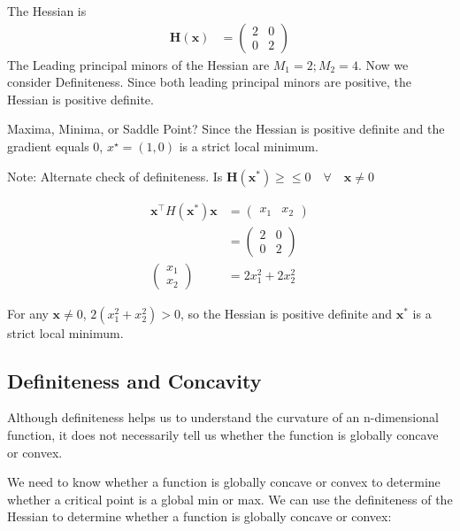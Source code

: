 \documentclass[]{book}
\theoremstyle{definition}
\theoremstyle{definition}
\theoremstyle{definition}
\theoremstyle{remark}
\let\BeginKnitrBlock\begin \let\EndKnitrBlock\end
\begin{document}
\BeginKnitrBlock{solution}
{}
The Hessian is
\begin{align*}
\mathbf{H(x)} &= \begin{pmatrix} 2&0\\0&2 \end{pmatrix}
\end{align*}
The Leading principal minors of the Hessian are \(M_1=2; M_2=4\). Now we consider Definiteness. Since both leading principal minors are positive, the Hessian is positive definite.

Maxima, Minima, or Saddle Point? Since the Hessian is positive definite and the gradient equals 0, \(x^\star = (1,0)\) is a strict local minimum.

Note: Alternate check of definiteness. Is \(\mathbf{H(x^*)} \geq \leq 0 \quad \forall \quad \mathbf{x}\ne 0\)

\begin{align*}
\mathbf{x}^\top H(\mathbf{x}^*) \mathbf{x} &= \begin{pmatrix} x_1 & x_2 \end{pmatrix}\\
&= \begin{pmatrix} 2&0\\0&2 \end{pmatrix}\\
\begin{pmatrix} x_1\\x_2\end{pmatrix} &= 2x_1^2+2x_2^2
\end{align*}

For any \(\mathbf{x}\ne 0\), \(2(x_1^2+x_2^2)>0\), so the Hessian is positive definite and \(\mathbf{x}^*\) is a strict local minimum.
\EndKnitrBlock{solution}

\hypertarget{definiteness-and-concavity}{%
\subsection*{Definiteness and Concavity}\label{definiteness-and-concavity}}

Although definiteness helps us to understand the curvature of an n-dimensional function, it does not necessarily tell us whether the function is globally concave or convex.

We need to know whether a function is globally concave or convex to determine whether a critical point is a global min or max. We can use the definiteness of the Hessian to determine whether a function is globally concave or convex:
\end{document}
